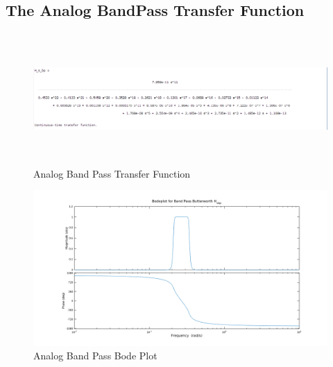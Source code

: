 \documentclass[22pt]{article}
\begin{document}
\subsection{The Analog BandPass Transfer Function}
\begin{figure}[H]
  \centering
  \includegraphics[width=1.2\textwidth,height=5cm]{images/Analog_but_bp_tf}
  \caption{Analog Band Pass Transfer Function}
  \label{fig:3}
\end{figure}
\begin{figure}[H]
  \centering
  \includegraphics[scale=0.5]{images/Bodeplot_but_bp}
  \caption{Analog Band Pass Bode Plot}
  \label{fig:4}  
\end{figure}
\end{document}
